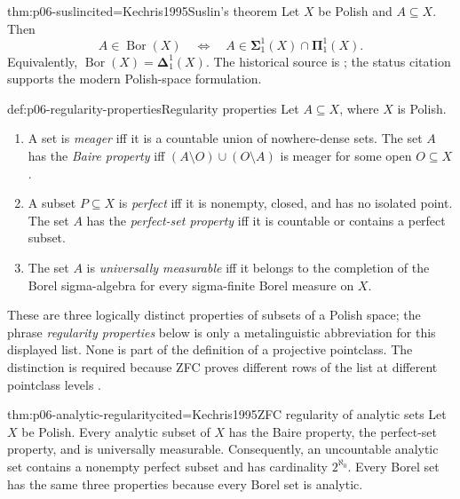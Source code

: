 \begin{hbtheorem}{thm:p06-suslin}{cited=Kechris1995}{Suslin's theorem}
Let \(X\) be Polish and \(A\subseteq X\).  Then
\[
  A\in\operatorname{Bor}(X)
  \quad\Leftrightarrow\quad
  A\in
  \boldsymbol{\Sigma}^{1}_{1}(X)
  \cap
  \boldsymbol{\Pi}^{1}_{1}(X).
\]
Equivalently,
\(\operatorname{Bor}(X)=\boldsymbol{\Delta}^{1}_{1}(X)\).
The historical source is \cite{Suslin1917}; the status citation supports the
modern Polish-space formulation.
\end{hbtheorem}

\begin{hbdefinition}{def:p06-regularity-properties}{Regularity properties}
Let \(A\subseteq X\), where \(X\) is Polish.
\begin{enumerate}
  \item A set is \emph{meager} iff it is a countable union of nowhere-dense
        sets.  The set \(A\) has the \emph{Baire property} iff
        \((A\setminus O)\cup(O\setminus A)\) is meager for some open
        \(O\subseteq X\).
  \item A subset \(P\subseteq X\) is \emph{perfect} iff it is nonempty,
        closed, and has no isolated point.  The set \(A\) has the
        \emph{perfect-set property} iff it is countable or contains a perfect
        subset.
  \item The set \(A\) is \emph{universally measurable} iff it belongs to the
        completion of the Borel sigma-algebra for every sigma-finite Borel
        measure on \(X\).
\end{enumerate}
These are three logically distinct properties of subsets of a Polish space;
the phrase \emph{regularity properties} below is only a metalinguistic
abbreviation for this displayed list.  None is part of the definition of a
projective pointclass.  The distinction is required because ZFC proves
different rows of the list at different pointclass levels
\cite[Sections~21, 29, 35]{Kechris1995}.
\end{hbdefinition}

\begin{hbtheorem}{thm:p06-analytic-regularity}{cited=Kechris1995}{ZFC regularity of analytic sets}
Let \(X\) be Polish.  Every analytic subset of \(X\) has the Baire property,
the perfect-set property, and is universally measurable.  Consequently, an
uncountable analytic set contains a nonempty perfect subset and has cardinality
\(2^{\aleph_0}\).  Every Borel set has the same three properties because every
Borel set is analytic.
\end{hbtheorem}

